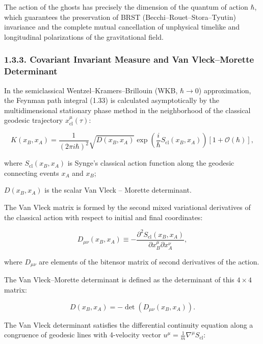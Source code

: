 \documentclass[11pt,a4paper]{article}
\theoremstyle{definition}
\begin{document}
The action of the ghosts has precisely the dimension of the quantum of action $\hbar$, which guarantees the preservation of BRST (Becchi--Rouet--Stora--Tyutin) invariance and the complete mutual cancellation of unphysical timelike and longitudinal polarizations of the gravitational field.


\subsubsection{1.3.3. Covariant Invariant Measure and Van Vleck--Morette Determinant}\label{sec:1.3.3}

In the semiclassical Wentzel--Kramers--Brillouin (WKB, $\hbar \to 0$) approximation, the Feynman path integral (1.33) is calculated asymptotically by the multidimensional stationary phase method in the neighborhood of the classical geodesic trajectory $x_{\text{cl}}^\mu(\tau)$:

\begin{equation}\label{eq:1.52}\tag{1.52}
K(x_B, x_A) = \frac{1}{(2\pi i \hbar)^2} \sqrt{D(x_B, x_A)} \exp\left( \frac{i}{\hbar} S_{\text{cl}}(x_B, x_A) \right) \left[ 1 + \mathcal{O}(\hbar) \right],
\end{equation}

where $S_{\text{cl}}(x_B, x_A)$ is Synge's classical action function along the geodesic connecting events $x_A$ and $x_B$;  

$D(x_B, x_A)$ is the scalar Van Vleck \cite{ref8} -- Morette \cite{ref9} determinant.

The Van Vleck matrix is formed by the second mixed variational derivatives of the classical action with respect to initial and final coordinates:

\begin{equation}\label{eq:1.53}\tag{1.53}
D_{\mu\nu}(x_B, x_A) \equiv -\frac{\partial^2 S_{\text{cl}}(x_B, x_A)}{\partial x_B^\mu \partial x_A^\nu},
\end{equation}

where $D_{\mu\nu}$ are elements of the bitensor matrix of second derivatives of the action.

The Van Vleck--Morette determinant is defined as the determinant of this $4 \times 4$ matrix:

\begin{equation}\label{eq:1.55}\tag{1.55}
D(x_B, x_A) = -\det \left( D_{\mu\nu}(x_B, x_A) \right).
\end{equation}

The Van Vleck determinant satisfies the differential continuity equation along a congruence of geodesic lines with 4-velocity vector $u^\mu = \frac{1}{m} \nabla^\mu S_{\text{cl}}$:
\end{document}
